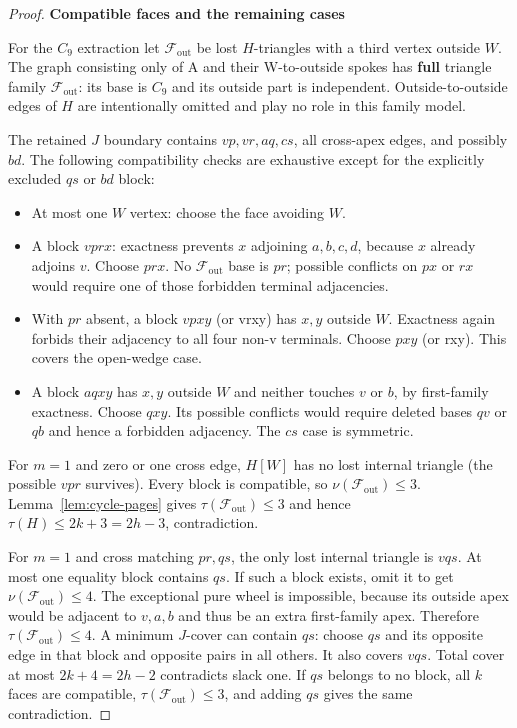 \documentclass[11pt]{article}
\theoremstyle{definition}\newtheorem{definition}[theorem]{Definition}
\theoremstyle{remark}\newtheorem{remark}[theorem]{Remark}
\begin{document}
\begin{proof}
\par\medskip\noindent\textbf{Compatible faces and the remaining cases}\label{compatible-faces-and-the-remaining-cases}

For the \(C_9\) extraction let \(\mathcal F_{\mathrm{out}}\) be lost \(H\)-triangles with a third vertex outside \(W\). The graph consisting only of A and their W-to-outside spokes has \textbf{full} triangle family \(\mathcal F_{\mathrm{out}}\): its base is \(C_9\) and its outside part is independent. Outside-to-outside edges of \(H\) are intentionally omitted and play no role in this family model.

The retained \(J\) boundary contains \(vp,vr,aq,cs\), all cross-apex edges, and possibly \(bd\). The following compatibility checks are exhaustive except for the explicitly excluded \(qs\) or \(bd\) block:

\begin{itemize}

\item
  At most one \(W\) vertex: choose the face avoiding \(W\).
\item
  A block \(vprx\): exactness prevents \(x\) adjoining \(a,b,c,d\), because \(x\) already adjoins \(v\). Choose \(prx\). No \(\mathcal F_{\mathrm{out}}\) base is \(pr\); possible conflicts on \(px\) or \(rx\) would require one of those forbidden terminal adjacencies.
\item
  With \(pr\) absent, a block \(vpxy\) (or vrxy) has \(x,y\) outside \(W\). Exactness again forbids their adjacency to all four non-v terminals. Choose \(pxy\) (or rxy). This covers the open-wedge case.
\item
  A block \(aqxy\) has \(x,y\) outside \(W\) and neither touches \(v\) or \(b\), by first-family exactness. Choose \(qxy\). Its possible conflicts would require deleted bases \(qv\) or \(qb\) and hence a forbidden adjacency. The \(cs\) case is symmetric.
\end{itemize}

For \(m=1\) and zero or one cross edge, \(H[W]\) has no lost internal triangle (the possible \(vpr\) survives). Every block is compatible, so \(\nu(\mathcal F_{\mathrm{out}})\le 3\). Lemma~\ref{lem:cycle-pages} gives \(\tau(\mathcal F_{\mathrm{out}})\le 3\) and hence \(\tau(H)\le 2k+3=2h-3\), contradiction.

For \(m=1\) and cross matching \(pr,qs\), the only lost internal triangle is \(vqs\). At most one equality block contains \(qs\). If such a block exists, omit it to get \(\nu(\mathcal F_{\mathrm{out}})\le 4\). The exceptional pure wheel is impossible, because its outside apex would be adjacent to \(v,a,b\) and thus be an extra first-family apex. Therefore \(\tau(\mathcal F_{\mathrm{out}})\le 4\). A minimum \(J\)-cover can contain \(qs\): choose \(qs\) and its opposite edge in that block and opposite pairs in all others. It also covers \(vqs\). Total cover at most \(2k+4=2h-2\) contradicts slack one. If \(qs\) belongs to no block, all \(k\) faces are compatible, \(\tau(\mathcal F_{\mathrm{out}})\le 3\), and adding \(qs\) gives the same contradiction.


\end{proof}
\end{document}

